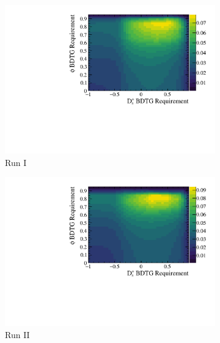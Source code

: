 \begin{figure}[!h]
   \centering
   \begin{subfigure}[t]{0.4\textwidth}
      \centering
      \includegraphics[width=1.0\textwidth]{figs/Selection/Ds2KKPi_BDTG_punzi_Run1_cont.pdf}
      \caption{Run I \decay{\Dsp}{\Kp\Km\pip}}
   \end{subfigure}
   \begin{subfigure}[t]{0.4\textwidth}
      \centering
      \includegraphics[width=1.0\textwidth]{figs/Selection/Ds2KKPi_BDTG_punzi_Run2_cont.pdf}
      \caption{Run II \decay{\Dsp}{\Kp\Km\pip}}
   \end{subfigure}\\
   \begin{subfigure}[t]{0.4\textwidth}

\end{subfigure}
\end{figure}
